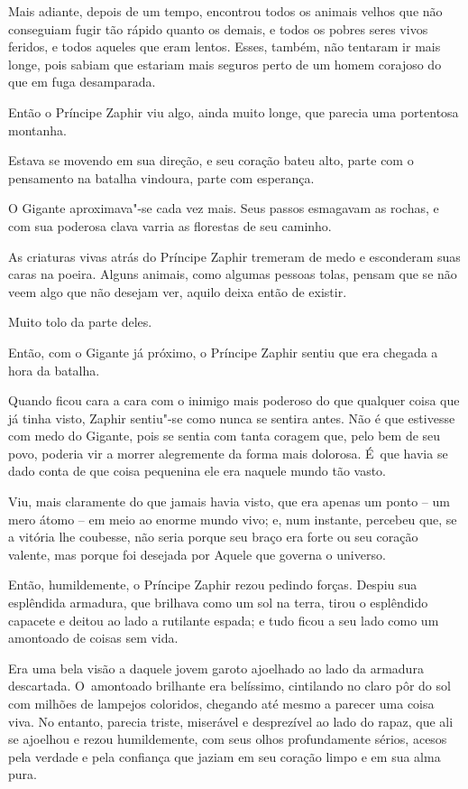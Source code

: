 Mais adiante, depois de um tempo, encontrou todos os animais velhos
que não conseguiam fugir tão rápido quanto os demais, e todos os pobres seres
vivos feridos, e todos aqueles que eram lentos. Esses, também, não
tentaram ir mais longe, pois sabiam que estariam mais seguros perto de
um homem corajoso do que em fuga desamparada.

Então o Príncipe Zaphir viu algo, ainda muito longe, que parecia uma
portentosa montanha.

Estava se movendo em sua direção, e seu coração bateu alto, parte com o
pensamento na batalha vindoura, parte com esperança.

O Gigante aproximava"-se cada vez mais. Seus passos esmagavam as rochas,
e com sua poderosa clava varria as florestas de seu caminho.

As criaturas vivas atrás do Príncipe Zaphir tremeram de medo e
esconderam suas caras na poeira. Alguns animais, como algumas pessoas
tolas, pensam que se não veem algo que não desejam ver, aquilo deixa então
de existir.

Muito tolo da parte deles.

Então, com o Gigante já próximo, o Príncipe Zaphir sentiu que era
chegada a hora da batalha.



Quando ficou cara a cara com o inimigo mais poderoso do que qualquer
coisa que já tinha visto, Zaphir sentiu"-se como nunca se sentira antes. Não é que
estivesse com medo do Gigante, pois se sentia com tanta coragem que,
pelo bem de seu povo, poderia vir a morrer alegremente da forma mais
dolorosa. É~que havia se dado conta de que coisa pequenina ele era
naquele mundo tão vasto.

Viu, mais claramente do que jamais havia visto, que era apenas um ponto
-- um mero átomo -- em meio ao enorme mundo vivo; e, num instante, percebeu que,
se a vitória lhe coubesse, não seria porque seu braço era forte ou seu
coração valente, mas porque foi desejada por Aquele que governa o
universo.

Então, humildemente, o Príncipe Zaphir rezou pedindo forças.
Despiu sua esplêndida armadura, que brilhava como um sol na terra,
tirou o esplêndido capacete e deitou ao lado a rutilante espada; e tudo
ficou a seu lado como um amontoado de coisas sem vida.

Era uma bela visão a daquele jovem garoto ajoelhado ao lado da armadura
descartada. O~amontoado brilhante era belíssimo, cintilando no claro pôr
do sol com milhões de lampejos coloridos, chegando até mesmo a parecer
uma coisa viva. No entanto, parecia triste, miserável e desprezível ao lado
do rapaz, que ali se ajoelhou e rezou humildemente, com seus olhos
profundamente sérios, acesos pela verdade e pela confiança que jaziam em
seu coração limpo e em sua alma pura.

